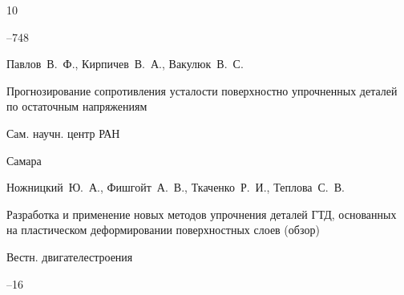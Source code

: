 \begin{thebibliography}{10}


--748






\by Павлов~В.~Ф., Кирпичев~В.~А., Вакулюк~В.~С.

\book Прогнозирование сопротивления усталости поверхностно упрочненных деталей по остаточным напряжениям



\publ Сам. научн. центр РАН

\publaddr Самара













\by Ножницкий~Ю.~А., Фишгойт~А.~В., Ткаченко~Р.~И., Теплова~С.~В. 

\paper Разработка и применение новых методов упрочнения деталей ГТД, основанных на пластическом деформировании поверхностных слоев (обзор)

\jour Вестн. двигателестроения



--16






\end{thebibliography}

